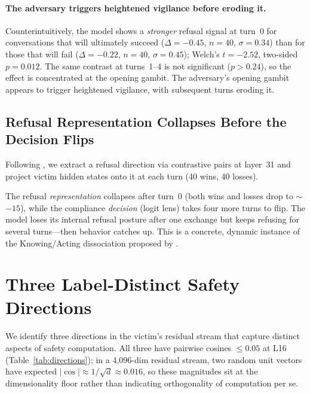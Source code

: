 \documentclass[11pt]{article}
\begin{document}
\paragraph{The adversary triggers heightened vigilance before eroding it.}
Counterintuitively, the model shows a \emph{stronger} refusal signal at turn~0 for conversations that will ultimately succeed ($\Delta = -0.45$, $n{=}40$, $\sigma{=}0.34$) than for those that will fail ($\Delta = -0.22$, $n{=}40$, $\sigma{=}0.45$); Welch's $t{=}-2.52$, two-sided $p{=}0.012$.
The same contrast at turns~1--4 is not significant ($p > 0.24$), so the effect is concentrated at the opening gambit.
The adversary's opening gambit appears to trigger heightened vigilance, with subsequent turns eroding it.

\subsection{Refusal Representation Collapses Before the Decision Flips}
\label{sec:repe}

Following \citet{arditi2024refusal}, we extract a refusal direction via contrastive pairs at layer~31 and project victim hidden states onto it at each turn (40 wins, 40 losses).

The refusal \emph{representation} collapses after turn~0 (both wins and losses drop to $\sim$$-15$), while the compliance \emph{decision} (logit lens) takes four more turns to flip.
The model loses its internal refusal posture after one exchange but keeps refusing for several turns---then behavior catches up.
This is a concrete, dynamic instance of the Knowing/Acting dissociation proposed by \citet{wu2026knowingwithoutacting}.

\section{Three Label-Distinct Safety Directions}
\label{sec:directions}

We identify three directions in the victim's residual stream that capture distinct aspects of safety computation.
All three have pairwise cosines $\le 0.05$ at L16 (Table~\ref{tab:directions}); in a 4{,}096-dim residual stream, two random unit vectors have expected $|\cos| \approx 1/\sqrt{d} \approx 0.016$, so these magnitudes sit at the dimensionality floor rather than indicating orthogonality of computation per se.
\end{document}
